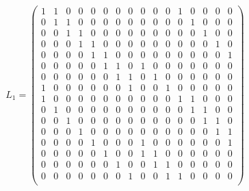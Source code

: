 \documentclass{transcrypto}
\begin{document}
\begin{appendices}
	\begin{equation*}
	L_1 = 
	\begin{pmatrix}
	1 & 1 & 0 & 0 & 0 & 0 & 0 & 0 & 0 & 0 & 0 & 1 & 0 & 0 & 0 & 0 \\ 
	0 & 1 & 1 & 0 & 0 & 0 & 0 & 0 & 0 & 0 & 0 & 0 & 1 & 0 & 0 & 0 \\ 
	0 & 0 & 1 & 1 & 0 & 0 & 0 & 0 & 0 & 0 & 0 & 0 & 0 & 1 & 0 & 0  \\ 
	0 & 0 & 0 & 1 & 1 & 0 & 0 & 0 & 0 & 0 & 0 & 0 & 0 & 0 & 1 & 0 \\ 
	0 & 0 & 0 & 0 & 1 & 1 & 0 & 0 & 0 & 0 & 0 & 0 & 0 & 0 & 0 & 1 \\ 
	0 & 0 & 0 & 0 & 0 & 1 & 1 & 0 & 1 & 0 & 0 & 0 & 0 & 0 & 0 & 0   \\ 
	0 & 0 & 0 & 0 & 0 & 0 & 1 & 1 & 0 & 1 & 0 & 0 & 0 & 0 & 0 & 0 \\ 
	1 & 0 & 0 & 0 & 0 & 0 & 0 & 1 & 0 & 0 & 1 & 0 & 0 & 0 & 0 & 0 \\ 
	1 & 0 & 0 & 0 & 0 & 0 & 0 & 0 & 0 & 0 & 0 & 1 & 1 & 0 & 0 & 0 \\ 
	0 & 1 & 0 & 0 & 0 & 0 & 0 & 0 & 0 & 0 & 0 & 0 & 1 & 1 & 0 & 0 \\ 
	0 & 0 & 1 & 0 & 0 & 0 & 0 & 0 & 0 & 0 & 0 & 0 & 0 & 1 & 1 & 0   \\ 
	0 & 0 & 0 & 1 & 0 & 0 & 0 & 0 & 0 & 0 & 0 & 0 & 0 & 0 & 1 & 1 \\ 
	0 & 0 & 0 & 0 & 1 & 0 & 0 & 0 & 1 & 0 & 0 & 0 & 0 & 0 & 0 & 1 \\ 
	0 & 0 & 0 & 0 & 0 & 1 & 0 & 0 & 1 & 1 & 0 & 0 & 0 & 0 & 0 & 0    \\ 
	0 & 0 & 0 & 0 & 0 & 0 & 1 & 0 & 0 & 1 & 1 & 0 & 0 & 0 & 0 & 0  \\ 
	0 & 0 & 0 & 0 & 0 & 0 & 0 & 1 & 0 & 0 & 1 & 1 & 0 & 0 & 0 & 0 \\ 
	\end{pmatrix}
	\end{equation*}
	

\end{appendices}
\end{document}
